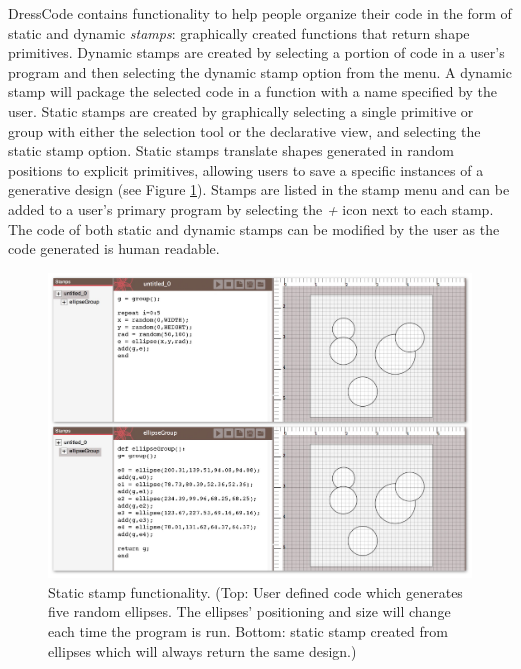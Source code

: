 \documentclass{sigchi}
\begin{document}
DressCode contains functionality to help people organize their code in the form of static and dynamic \textit{stamps}: graphically created functions that return shape primitives. Dynamic stamps are created by selecting a portion of code in a user's program and then selecting the dynamic stamp option from the menu. A dynamic stamp will package the selected code in a function with a name specified by the user. Static stamps are created by graphically selecting a single primitive or group with either the selection tool or the declarative view, and selecting the static stamp option. Static stamps translate shapes generated in random positions to explicit primitives, allowing users to save a specific instances of a generative design (see Figure \ref{fig:stamps}).
Stamps are listed in the stamp menu and can be added to a user's primary program by selecting the \textit{+} icon next to each stamp. The code of both static and dynamic stamps can be modified by the user as the code generated is human readable.

\begin{center}
\begin{figure}[h!]
\includegraphics[width=\columnwidth]{images/stamps.jpg}
\caption{Static stamp functionality. (Top: User defined code which generates five random ellipses. The ellipses' positioning and size will change each time the program is run. Bottom: static stamp created from ellipses which will always return the same design.)}
\label{fig:stamps}
\end{figure}
\end{center}
\vspace{-20pt}
\end{document}
